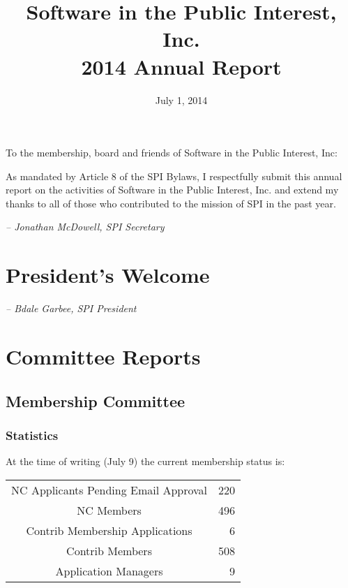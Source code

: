 \documentclass[letterpaper]{report}
\begin{document}
\title{Software in the Public Interest, Inc.\\
2014 Annual Report}
\date{July 1, 2014}

\maketitle

To the membership, board and friends of Software in the Public Interest, Inc:

As mandated by Article 8 of the SPI Bylaws, I respectfully submit this annual
report on the activities of Software in the Public Interest, Inc. and extend my
thanks to all of those who contributed to the mission of SPI in the past year.

  \emph{-- Jonathan McDowell, SPI Secretary}

\newpage

\tableofcontents

\newpage

\chapter{President's Welcome}
\label{sec:president}

  \emph{-- Bdale Garbee, SPI President}

\chapter{Committee Reports}
\section{Membership Committee}

\subsection{Statistics}

At the time of writing (July 9) the current membership status is:

\begin{tabular}{ | c | r | }
\hline
NC Applicants Pending Email Approval	& 220 \\
NC Members				& 496 \\
Contrib Membership Applications		& 6 \\
Contrib Members				& 508 \\
Application Managers			& 9 \\
\hline
\end{tabular}
\end{document}
